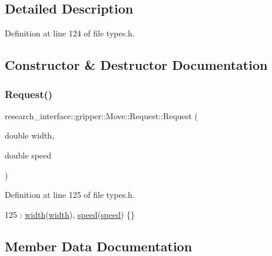 \subsection{Detailed Description}


Definition at line 124 of file types.\+h.



\subsection{Constructor \& Destructor Documentation}
\mbox{\label{structresearch__interface_1_1gripper_1_1Move_1_1Request_af4e9e7e0f638a18f69f2d169f90752e3}} 
\subsubsection{\texorpdfstring{Request()}{Request()}}
{\footnotesize\ttfamily research\+\_\+interface\+::gripper\+::\+Move\+::\+Request\+::\+Request (\begin{DoxyParamCaption}\item[{double}]{width,  }\item[{double}]{speed }\end{DoxyParamCaption})\hspace{0.3cm}{\ttfamily [inline]}}



Definition at line 125 of file types.\+h.


\begin{DoxyCode}
125 : \hyperlink{structresearch__interface_1_1gripper_1_1Move_1_1Request_a06e31cef24a449bac2ca4410898cab2f}{width}(\hyperlink{structresearch__interface_1_1gripper_1_1Move_1_1Request_a06e31cef24a449bac2ca4410898cab2f}{width}), \hyperlink{structresearch__interface_1_1gripper_1_1Move_1_1Request_a045b73489d6d309f4927db942d966b8b}{speed}(\hyperlink{structresearch__interface_1_1gripper_1_1Move_1_1Request_a045b73489d6d309f4927db942d966b8b}{speed}) \{\}
\end{DoxyCode}


\subsection{Member Data Documentation}
\mbox{\label{structresearch__interface_1_1gripper_1_1Move_1_1Request_a045b73489d6d309f4927db942d966b8b}} 
